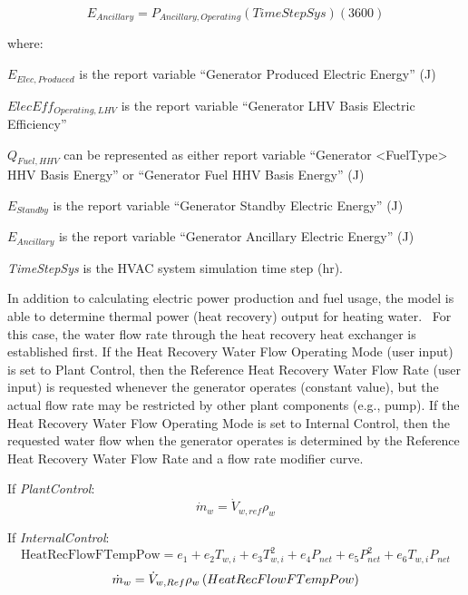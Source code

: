 \begin{equation}
{E_{Ancillary}} = {P_{Ancillary,Operating}}\left( {TimeStepSys} \right)\left( {3600} \right)
\end{equation}

where:

\({E_{Elec,Produced}}\) is the report variable ``Generator Produced Electric Energy'' (J)

\(ElecEf{f_{Operating,LHV}}\) is the report variable ``Generator LHV Basis Electric Efficiency''

\({Q_{Fuel,HHV}}\) can be represented as either report variable ``Generator \textless{}FuelType\textgreater{} HHV Basis Energy'' or ``Generator Fuel HHV Basis Energy'' (J)

\({E_{Standby}}\) is the report variable ``Generator Standby Electric Energy'' (J)

\({E_{Ancillary}}\) is the report variable ``Generator Ancillary Electric Energy'' (J)

\emph{TimeStepSys} is the HVAC system simulation time step (hr).

In addition to calculating electric power production and fuel usage, the model is able to determine thermal power (heat recovery) output for heating water.~ For this case, the water flow rate through the heat recovery heat exchanger is established first. If the Heat Recovery Water Flow Operating Mode (user input) is set to Plant Control, then the Reference Heat Recovery Water Flow Rate (user input) is requested whenever the generator operates (constant value), but the actual flow rate may be restricted by other plant components (e.g., pump). If the Heat Recovery Water Flow Operating Mode is set to Internal Control, then the requested water flow when the generator operates is determined by the Reference Heat Recovery Water Flow Rate and a flow rate modifier curve.

If \emph{PlantControl}:
\begin{equation}
  \dot{m}_w = \dot{V}_{w,ref}\rho_w
\end{equation}

If \emph{InternalControl}:
\begin{equation}
  \text{HeatRecFlowFTempPow} = e_1 + e_2 T_{w,i} + e_3 T_{w,i}^2 + e_4 P_{net} + e_5 P_{net}^2 + e_6 T_{w,i} P_{net}
\end{equation}
\begin{equation}
  \dot{m}_w = \dot{V}_{w,Ref} \rho_w \left(HeatRecFlowFTempPow\right)
\end{equation}

